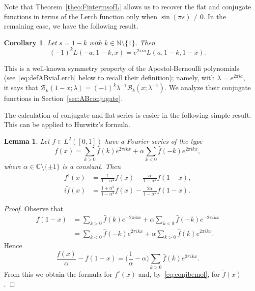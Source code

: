 \documentclass[11pt,a4paper,reqno]{amsart}
\newcommand{\B}{\mathcal{B}}
\newcommand{\C}{\mathbb{C}}
\newcommand{\N}{\mathbb{N}}
\let\hat\widehat
\let\tilde\widetilde
\theoremstyle{plain}
\newtheorem{cor}[theorem]{Corollary}
\newtheorem{lemma}[theorem]{Lemma}
\theoremstyle{remark}
\numberwithin{equation}{section}
\begin{document}
Note that Theorem~\ref{theo:FintermsofL} allows us to recover the flat and conjugate functions in terms of the Lerch function only when $\sin(\pi s)\not=0$. In the remaining case, we have the following result.

\begin{cor}
Let $s=1-k$ with $k\in \N \setminus\{1\}$. Then
\begin{equation*}
    (-1)^{k}  L(-a,1-k,x)
  = e^{2\pi i a }L(a,1-k,1-x).
\end{equation*}
\end{cor}

This is a well-known symmetry property of the Apostol-Bernoulli polynomials (see~\eqref{eq:defABviaLerch} below to recall their definition); namely, with $\lambda=e^{2\pi ia}$, it says that $\B_{k}(1-x;\lambda) = (-1)^{k} \lambda^{-1} \B_{k}(x;\lambda^{-1})$. We analyze their conjugate functions in Section~\ref{sec:ABconjugate}.

The calculation of conjugate and flat series is easier in the following simple result. This can be applied to Hurwitz's formula.

\begin{lemma}
\label{lem:casosencillo}
Let $f\in L^2([0,1])$ have a Fourier series of the type
\begin{equation*}
  f(x) = \sum_{k>0} \hat{f}(k)e^{2\pi ikx} + \alpha \sum_{k<0}\hat{f}(-k)e^{2\pi ikx},
\end{equation*}
where $\alpha\in\C \setminus \{\pm1\}$ is a constant. Then
\begin{align*}
  f^\flat(x) &= \frac{1}{1-\alpha^2}f(x) - \frac{\alpha}{1-\alpha^2}f(1-x), \\
  i\tilde{f}(x) &= \frac{1+\alpha^2}{1-\alpha^2}f(x) - \frac{2\alpha}{1-\alpha^2} f(1-x).
\end{align*}
\end{lemma}

\begin{proof}
Observe that
\begin{align*}
  f(1-x) &= \sum_{k>0} \hat{f}(k)e^{-2\pi ikx} + \alpha \sum_{k<0} \hat{f}(-k)e^{-2\pi ikx} \\
  &= \sum_{k<0} \hat{f}(-k)e^{2\pi ikx} + \alpha \sum_{k>0} \hat{f}(k) e^{2\pi ikx}.
\end{align*}
Hence
\begin{equation*}
  \frac{f(x)}{\alpha}-f(1-x) = \biggl(\frac{1}{\alpha}- \alpha\biggr) \sum_{k>0}\hat{f}(k)e^{2\pi ikx}.
\end{equation*}
From this we obtain the formula for $f^\flat(x)$ and, by~\eqref{eq:conjbemol}, for $\tilde{f}(x)$.
\end{proof}
\end{document}
